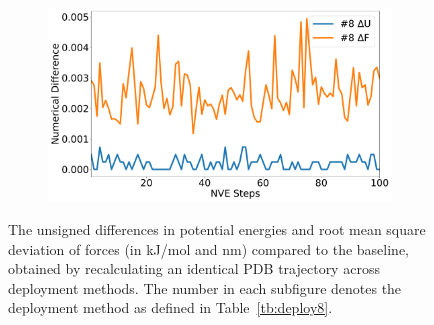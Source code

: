 \begin{figure}[htbp]
\begin{subfigure}{0.48\textwidth}
\end{subfigure}
\begin{subfigure}{0.48\textwidth}
\includegraphics[width=\linewidth]{figs/rerun8.pdf}
\end{subfigure}
\caption{The unsigned differences in potential energies
and root mean square deviation of forces (in kJ/mol and nm)
compared to the baseline,
obtained by recalculating an identical PDB trajectory
across deployment methods.
The number in each subfigure denotes the deployment method
as defined in Table~\ref{tb:deploy8}.}
\label{fig:reruns}
\end{figure}
